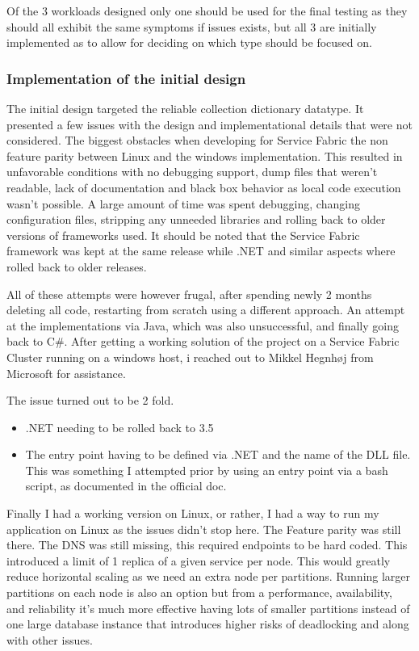 \documentclass[a4paper,10pt,titlepage]{report}
\begin{document}
    Of the 3 workloads designed only one should be used for the final testing as they should all exhibit the same symptoms if issues exists, but all 3 are initially implemented as to allow for deciding on which type should be focused on.
    

  

\subsubsection{Implementation of the initial design}

The initial design targeted the reliable collection dictionary datatype. It presented a few issues with the design and implementational details that were not considered. The biggest obstacles when developing for Service Fabric the non feature parity between Linux and the windows implementation. This resulted in unfavorable conditions with no debugging support, dump files that weren't readable, lack of documentation and black box behavior as local code execution wasn't possible. 
A large amount of time was spent debugging, changing configuration files, stripping any unneeded libraries and rolling back to older versions of frameworks used. It should be noted that the Service Fabric framework was kept at the same release while .NET and similar aspects where rolled back to older releases.

All of these attempts were however frugal, after spending newly 2 months deleting all code, restarting from scratch using a different approach. An attempt at the implementations via Java, which was also unsuccessful, and finally going back to C\#. After getting a working solution of the project on a Service Fabric Cluster running on a windows host, i reached out to Mikkel Hegnhøj from Microsoft for assistance.

The issue turned out to be 2 fold.
\begin{itemize}
    \item .NET needing to be rolled back to 3.5
    \item The entry point having to be defined via .NET and the name of the DLL file. This was something I attempted prior by using an entry point via a bash script, as documented in the official doc. 
    \end{itemize}

Finally I had a working version on Linux, or rather, I had a way to run my application on Linux as the issues didn't stop here. The Feature parity was still there. The DNS was still missing, this required endpoints to be hard coded. This introduced a limit of 1 replica of a given service per node. This would greatly reduce horizontal scaling as we need an extra node per partitions. Running larger partitions on each node is also an option but from a performance, availability, and reliability it's much more effective having lots of smaller partitions instead of one large database instance that introduces higher risks of deadlocking and along with other issues.
\end{document}
